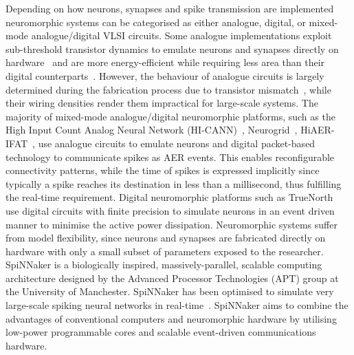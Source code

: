 Depending on how neurons, synapses and spike transmission are implemented neuromorphic systems can be categorised as either analogue, digital, or mixed-mode analogue/digital VLSI circuits. Some analogue implementations exploit sub-threshold transistor dynamics to emulate neurons and synapses directly on hardware~\citep{indiveri2011neuromorphic} and are more energy-efficient while requiring less area than their digital counterparts~\citep{joubert2012hardware}. However, the behaviour of analogue circuits is largely determined during the fabrication process due to transistor mismatch~\citep{indiveri2011neuromorphic,pedram2006thermal,linares2003compact}, while their wiring densities render them impractical for large-scale systems. The majority of mixed-mode analogue/digital neuromorphic platforms, such as the High Input Count Analog Neural Network (HI-CANN)~\citep{schemmel2010wafer}, Neurogrid~\citep{benjamin2014neurogrid}, HiAER-IFAT~\citep{yu201265k}, use analogue circuits to emulate neurons and digital packet-based technology to communicate spikes as AER events. This enables reconfigurable connectivity patterns, while the time of spikes is expressed implicitly since typically a spike reaches its destination in less than a millisecond, thus fulfilling the real-time requirement. Digital neuromorphic platforms such as TrueNorth~\citep{merolla2014million} use digital circuits with finite precision to simulate neurons in an event driven manner to minimise the active power dissipation. Neuromorphic systems suffer from model flexibility, since neurons and synapses are fabricated directly on hardware with only a small subset of parameters exposed to the researcher. 
SpiNNaker is a biologically inspired, massively-parallel, scalable computing architecture designed by the Advanced Processor Technologies (APT) group at the University of Manchester. SpiNNaker has been optimised to simulate very large-scale spiking neural networks in real-time~\citep{furber2014spinnaker}. SpiNNaker aims to combine the advantages of conventional computers and neuromorphic hardware by utilising low-power programmable cores and scalable event-driven communications hardware.

